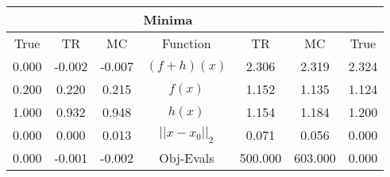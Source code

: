 \begin{tabular}{| c |c |c || c |c |c |c |}
    \hline
    \rowcolor[gray]{0.9}
\multicolumn{3}{|c|}{Parameters} & \multicolumn{4}{|c|}{Minima}\\ \hline True & TR & MC  & Function & TR & MC & True \\
    \hline
  \rowcolor[gray]{0.7}
  0.000 & -0.002 & -0.007   & $ (f + h)(x) $ & 2.306 & 2.319 & 2.324 \\
  \rowcolor[gray]{0.8}
  0.200 & 0.220 & 0.215   & $ f(x) $ & 1.152 & 1.135 & 1.124 \\
  \rowcolor[gray]{0.7}
  1.000 & 0.932 & 0.948   & $ h(x) $ & 1.154 & 1.184 & 1.200 \\
  \rowcolor[gray]{0.8}
  0.000 & 0.000 & 0.013   & $ ||x - x_0||_2 $ & 0.071 & 0.056 & 0.000 \\
  \rowcolor[gray]{0.7}
  0.000 & -0.001 & -0.002   & Obj-Evals & 500.000 & 603.000 & 0.000 \\
\end{tabular}
